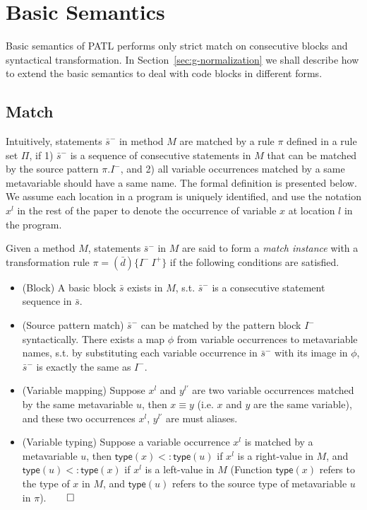 \documentclass[letterpaper, USenglish]{lipics-v2016}
\newcommand{\PATL}{PATL\xspace}
\theoremstyle{plain}
\begin{document}


\section{Basic Semantics}\label{sec:basic}

Basic semantics of \PATL performs only strict match on
consecutive blocks and syntactical transformation. In Section~\ref{sec:g-normalization}
we shall describe how to extend the basic semantics to deal with code blocks in
different forms.

\subsection{Match} 

Intuitively, statements $\bar{s}^-$ in method $M$ are matched by a
rule $\pi$ defined in a rule set $\Pi$, if 1) $\bar{s}^-$ is a sequence of consecutive statements in $M$ that can be matched by the source pattern $\pi.I^-$, and 2) all variable occurrences matched by a same metavariable
should have a same name. The formal definition is presented below. We assume each location in a program is uniquely identified, and use the notation $x^l$ in the rest of the paper to denote the occurrence of variable $x$ at location $l$ in the program.

\begin{definition}[Match]
\label{def:match}
Given a method $M$, statements $\bar{s}^{-}$ in $M$ are said to form a \emph{match instance} with a transformation rule $\pi=(\bar{d})\{I^{-}~I^+\}$ if the following conditions are satisfied.
\begin{itemize}
\item (Block) A basic block $\bar{s}$ exists in $M$, s.t. $\bar{s}^{-}$ is a consecutive statement sequence in $\bar{s}$.
\item (Source pattern match) $\bar{s}^{-}$ can be matched by the
  pattern block $I^{-}$ syntactically. There exists a map $\phi$
  from variable occurrences to metavariable names, s.t. by
  substituting each variable occurrence in $\bar{s}^-$ with its image
  in $\phi$, $\bar{s}^-$ is exactly the same as $I^-$.
\item (Variable mapping) Suppose $x^l$ and $y^{l'}$ are two variable occurrences matched by the same metavariable $u$, then $x\equiv y$ (i.e. $x$ and $y$ are the same variable), and these two occurrences $x^l$, $y^{l'}$ are must aliases.
\item (Variable typing) Suppose a variable occurrence $x^l$ is matched by a metavariable $u$, then $\mathsf{type}(x)<:\mathsf{type}(u)$ if $x^l$ is a right-value in $M$, and $\mathsf{type}(u)<:\mathsf{type}(x)$ if $x^l$ is a left-value in $M$ (Function $\mathsf{type}(x)$ refers to the type of $x$ in $M$, and $\mathsf{type}(u)$ refers to the source type of metavariable $u$ in $\pi$).\hfill $\qed$ 
\end{itemize}
\end{definition}
\end{document}
